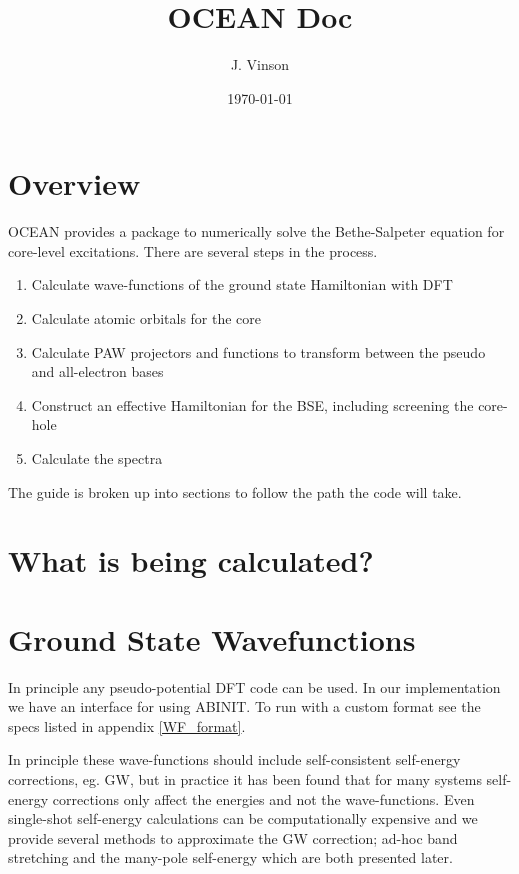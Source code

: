 \documentclass[12pt]{article}
\begin{document}
\title{OCEAN Doc}

\author{J. Vinson}
\date{\today}

\maketitle

\section{Overview}

OCEAN provides a package to numerically solve the Bethe-Salpeter equation for core-level excitations. There are several steps in the process.
\begin{enumerate}
\item Calculate wave-functions of the ground state Hamiltonian with DFT
\item Calculate atomic orbitals for the core
\item Calculate PAW projectors and functions to transform between the pseudo and all-electron bases
\item Construct an effective Hamiltonian for the BSE, including screening the core-hole
\item Calculate the spectra
\end{enumerate}

The guide is broken up into sections to follow the path the code will take.

\section{What is being calculated?}




\section{Ground State Wavefunctions}
In principle any pseudo-potential DFT code can be used. In our implementation we have an interface for using ABINIT\cite{abinit}. To run with a custom format see the specs listed in appendix \ref{WF_format}.

In principle these wave-functions should include self-consistent self-energy corrections, eg. GW, but in practice it has been found that for many systems 
self-energy corrections only affect the energies and not the wave-functions. Even single-shot self-energy calculations can be computationally expensive 
and we provide several methods to approximate the GW correction; ad-hoc band stretching and the many-pole self-energy which are both presented 
later.
\end{document}
